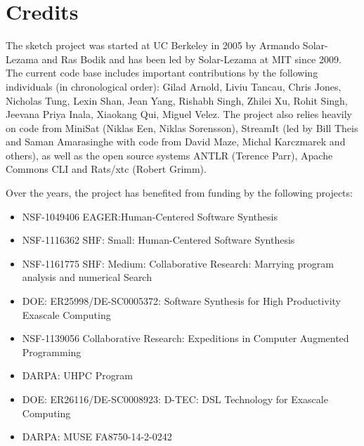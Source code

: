 \section{Credits}

The sketch project was started at UC Berkeley in 2005 by Armando Solar-Lezama and Ras Bodik and has been led by Solar-Lezama at MIT since 2009. The current code base includes important contributions by the following individuals (in chronological order): 
Gilad Arnold,
Liviu Tancau,
Chris Jones,
Nicholas Tung,
Lexin Shan,
Jean Yang,
Rishabh Singh,
Zhilei Xu,
Rohit Singh,
Jeevana Priya Inala,
Xiaokang Qui,
Miguel Velez.
The project also relies heavily on code from MiniSat (Niklas Een, Niklas Sorensson), StreamIt (led by Bill Theis and Saman Amarasinghe with code from David Maze, Michal Karczmarek and others), as well as the open source systems ANTLR (Terence Parr), Apache Commons CLI and Rats/xtc (Robert Grimm).

Over the years, the project has benefited from funding by the following projects:
\begin{itemize}
\item NSF-1049406 EAGER:Human-Centered Software Synthesis
\item NSF-1116362  SHF: Small: Human-Centered Software Synthesis
\item NSF-1161775 SHF: Medium: Collaborative Research: Marrying program analysis and numerical Search
\item DOE: ER25998/DE-SC0005372: Software Synthesis for High Productivity Exascale Computing
\item NSF-1139056 Collaborative Research: Expeditions in Computer Augmented Programming
\item DARPA: UHPC Program
\item DOE: ER26116/DE-SC0008923: D-TEC: DSL Technology for Exascale Computing 
\item DARPA: MUSE FA8750-14-2-0242
\end{itemize}

